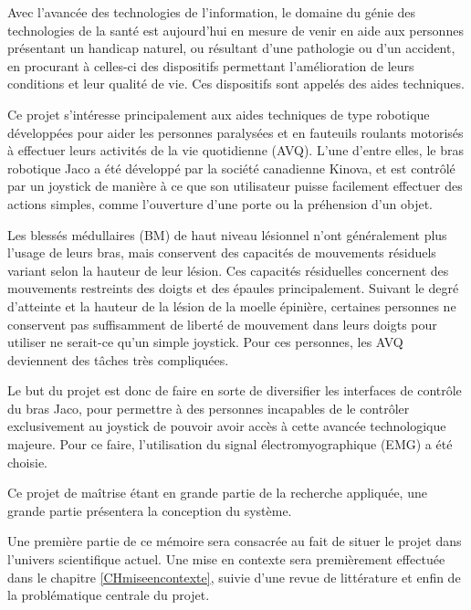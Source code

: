 \documentclass[letterpaper, twoside, 12pt, memoire, creativecommons, hyperref]{thETS}
\begin{document}

\reversemarginpar %

\begin{introduction}

Avec l’avancée des technologies de l’information, le domaine du génie des technologies de la santé est aujourd’hui en mesure de venir en aide aux personnes présentant un handicap naturel, ou résultant d’une pathologie ou d’un accident, en procurant à celles-ci des dispositifs permettant l’amélioration de leurs conditions et leur qualité de vie. Ces dispositifs sont appelés des aides techniques.

Ce projet s’intéresse principalement aux aides techniques de type robotique développées pour aider les personnes paralysées et en fauteuils roulants motorisés à effectuer leurs activités de la vie quotidienne (AVQ). L'une d'entre elles, le bras robotique Jaco a été développé par la société canadienne Kinova, et est contrôlé par un joystick de manière à ce que son utilisateur puisse facilement effectuer des actions simples, comme l’ouverture d’une porte ou la préhension d’un objet.

Les blessés médullaires (BM) de haut niveau lésionnel n’ont généralement plus l’usage de leurs bras, mais conservent des capacités de mouvements résiduels variant selon la hauteur de leur lésion. Ces capacités résiduelles concernent des mouvements restreints des doigts et des épaules principalement. Suivant le degré d’atteinte et la hauteur de la lésion de la moelle épinière, certaines personnes ne conservent pas suffisamment de liberté de mouvement dans leurs doigts pour utiliser ne serait-ce qu’un simple joystick. Pour ces personnes, les AVQ deviennent des tâches très compliquées.

Le but du projet est donc de faire en sorte de diversifier les interfaces de contrôle du bras Jaco, pour permettre à des personnes incapables de le contrôler exclusivement au joystick de pouvoir avoir accès à cette avancée technologique majeure. Pour ce faire, l'utilisation du signal électromyographique (EMG) a été choisie.

Ce projet de maîtrise étant en grande partie de la recherche appliquée, une grande partie présentera la conception du système. 

Une première partie de ce mémoire sera consacrée au fait de situer le projet dans l'univers scientifique actuel. Une mise en contexte sera premièrement effectuée dans le chapitre \ref{CHmiseencontexte}, suivie d'une revue de littérature et enfin de la problématique centrale du projet.


\end{introduction}
\end{document}
